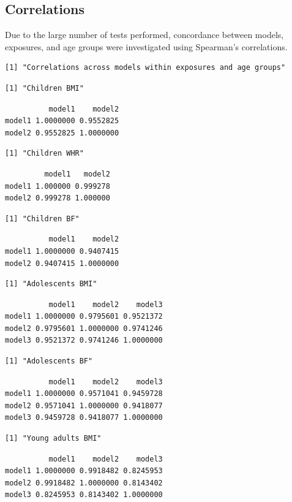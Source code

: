 \documentclass[11pt,twoside]{bristolthesis}
\begin{document}
\hypertarget{chapter4-appendix-correlations}{%
\subsection{Correlations}\label{chapter4-appendix-correlations}}

Due to the large number of tests performed, concordance between models, exposures, and age groups were investigated using Spearman's correlations.
\begin{verbatim}
[1] "Correlations across models within exposures and age groups"
\end{verbatim}
\begin{verbatim}
[1] "Children BMI"
\end{verbatim}
\begin{verbatim}
          model1    model2
model1 1.0000000 0.9552825
model2 0.9552825 1.0000000
\end{verbatim}
\begin{verbatim}
[1] "Children WHR"
\end{verbatim}
\begin{verbatim}
         model1   model2
model1 1.000000 0.999278
model2 0.999278 1.000000
\end{verbatim}
\begin{verbatim}
[1] "Children BF"
\end{verbatim}
\begin{verbatim}
          model1    model2
model1 1.0000000 0.9407415
model2 0.9407415 1.0000000
\end{verbatim}
\begin{verbatim}
[1] "Adolescents BMI"
\end{verbatim}
\begin{verbatim}
          model1    model2    model3
model1 1.0000000 0.9795601 0.9521372
model2 0.9795601 1.0000000 0.9741246
model3 0.9521372 0.9741246 1.0000000
\end{verbatim}
\begin{verbatim}
[1] "Adolescents BF"
\end{verbatim}
\begin{verbatim}
          model1    model2    model3
model1 1.0000000 0.9571041 0.9459728
model2 0.9571041 1.0000000 0.9418077
model3 0.9459728 0.9418077 1.0000000
\end{verbatim}
\begin{verbatim}
[1] "Young adults BMI"
\end{verbatim}
\begin{verbatim}
          model1    model2    model3
model1 1.0000000 0.9918482 0.8245953
model2 0.9918482 1.0000000 0.8143402
model3 0.8245953 0.8143402 1.0000000
\end{verbatim}
\end{document}
